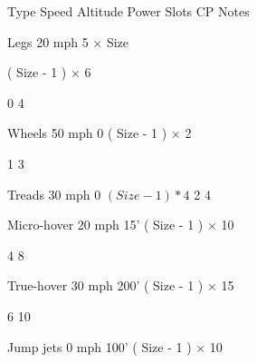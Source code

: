 \documentclass[twoside]{book}
\begin{document}
                    
                      
                       Type 
                       Speed   
                       Altitude 
                       Power   
                       Slots 
                       CP 
                       Notes   
                      
                      
                       Legs   
                       20 mph   
                             5    ×
                            Size   
                        
                             (    Size  
                          -    1    )   
                         ×    6   
                        
                       0   
                       4   
                      
                      
                       Wheels   
                       50 mph   
                       0   
                             (    Size  
                          -    1    )   
                         ×    2   
                        
                       1   
                       3   
                      
                      
                       Treads   
                       30 mph   
                       0   
                       $(Size-1)*4$   
                       2   
                       4   
                      
                      
                       Micro-hover   
                       20 mph   
                       15'   
                             (    Size  
                          -    1    )   
                         ×    10   
                        
                       4   
                       8   
                      
                      
                       True-hover   
                       30 mph   
                       200'   
                             (    Size  
                          -    1    )   
                         ×    15   
                        
                       6   
                       10   
                      
                      
                       Jump jets   
                       0 mph   
                       100'   
                             (    Size  
                          -    1    )   
                         ×    10   
                        
\end{document}
